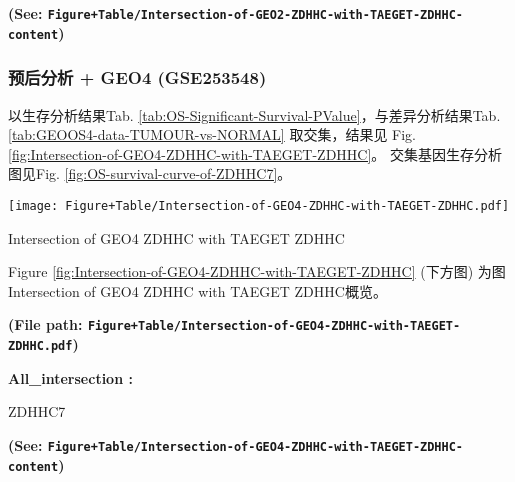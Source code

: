 \documentclass[
]{article}
\begin{document}
\textbf{(See: \texttt{Figure+Table/Intersection-of-GEO2-ZDHHC-with-TAEGET-ZDHHC-content})}

\hypertarget{ux9884ux540eux5206ux6790-geo4-gse253548}{%
\subsubsection{预后分析 + GEO4 (GSE253548)}\label{ux9884ux540eux5206ux6790-geo4-gse253548}}

以生存分析结果Tab. \ref{tab:OS-Significant-Survival-PValue}，与差异分析结果Tab. \ref{tab:GEOOS4-data-TUMOUR-vs-NORMAL}
取交集，结果见 Fig. \ref{fig:Intersection-of-GEO4-ZDHHC-with-TAEGET-ZDHHC}。
交集基因生存分析图见Fig. \ref{fig:OS-survival-curve-of-ZDHHC7}。

\begin{center}\vspace{1.5cm}\end{center}
\def\@captype{figure}
\begin{center}
\texttt{[image: Figure+Table/Intersection-of-GEO4-ZDHHC-with-TAEGET-ZDHHC.pdf]}
\caption{Intersection of GEO4 ZDHHC with TAEGET ZDHHC}\label{fig:Intersection-of-GEO4-ZDHHC-with-TAEGET-ZDHHC}
\end{center}

Figure \ref{fig:Intersection-of-GEO4-ZDHHC-with-TAEGET-ZDHHC} (下方图) 为图Intersection of GEO4 ZDHHC with TAEGET ZDHHC概览。

\textbf{(File path: \texttt{Figure+Table/Intersection-of-GEO4-ZDHHC-with-TAEGET-ZDHHC.pdf})}

\begin{center}\vspace{1.5cm}\end{center}\begin{center}\begin{tcolorbox}[colback=gray!10, colframe=gray!50, width=0.9\linewidth, arc=1mm, boxrule=0.5pt]
\textbf{
All\_intersection
:}

\vspace{0.5em}

    ZDHHC7

\vspace{2em}
\end{tcolorbox}
\end{center}

\textbf{(See: \texttt{Figure+Table/Intersection-of-GEO4-ZDHHC-with-TAEGET-ZDHHC-content})}
\end{document}
